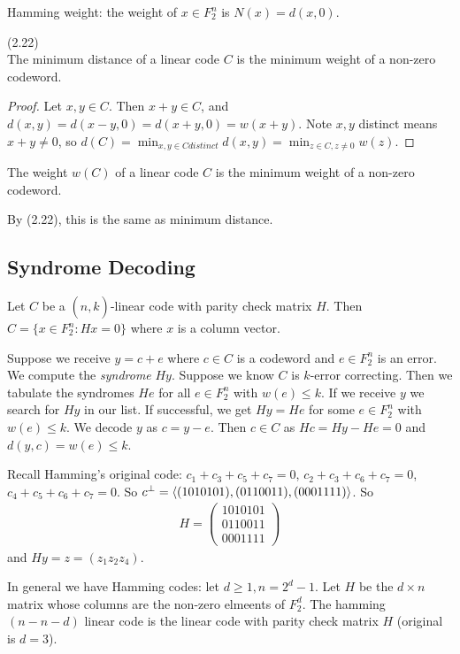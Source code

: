 \documentclass[a4paper]{article}
\begin{document}
Hamming weight: the weight of $x \in F_2^n$ is $N(x) = d(x,0)$.

\begin{lemma} (2.22)\\
The minimum distance of a linear code $C$ is the minimum weight of a non-zero codeword.
\begin{proof}
Let $x,y \in C$. Then $x+y \in C$, and $d(x,y) = d(x-y,0) = d(x+y,0) = w(x+y)$. Note $x,y$ distinct means $x+y \neq 0$, so $d(C) = \min_{x,y \in C distinct} d(x,y) = \min_{z \in C,z \neq 0} w(z)$.
\end{proof}
\end{lemma}

\begin{defi}
The weight $w(C)$ of a linear code $C$ is the minimum weight of a non-zero codeword.

By (2.22), this is the same as minimum distance.
\end{defi}

\subsection{Syndrome Decoding}
Let $C$ be a $(n,\hat{k})$-linear code with parity check matrix $H$. Then $C =\{x \in F_2^n: Hx = 0\}$ where $x$ is a column vector.

Suppose we receive $y=c+e$ where $c \in C$ is a codeword and $e \in F_2^n$ is an error. We compute the \emph{syndrome} $Hy$. Suppose we know $C$ is $k$-error correcting. Then we tabulate the syndromes $He$ for all $e \in F_2^n$ with $w(e) \leq k$. If we receive $y$ we search for $Hy$ in our list. If successful, we get $Hy = He$ for some $e \in F_2^n$ with $w(e) \leq k$. We decode $y$ as $c = y-e$. Then $c \in C$ as $Hc = Hy-He = 0$ and $d(y,c) = w(e) \leq k$.

Recall Hamming's original code: $c_1+c_3+c_5+c_7 = 0$, $c_2+c_3+c_6+c_7 = 0$, $c_4+c_5+c_6+c_7 = 0$. So $c^\perp = \langle (1010101),(0110011),(0001111)\rangle$. So 
\begin{equation*}
\begin{aligned}
H=\begin{pmatrix}
1010101\\
0110011\\
0001111
\end{pmatrix}
\end{aligned}
\end{equation*}
and $Hy = z = (z_1 z_2 z_4)$.

In general we have Hamming codes: let $d \geq 1, n = 2^d-1$. Let $H$ be the $d \times n$ matrix whose columns are the non-zero elmeents of $F_2^d$. The hamming $(n-n-d)$ linear code is the linear code with parity check matrix $H$ (original is $d=3$).
\end{document}
